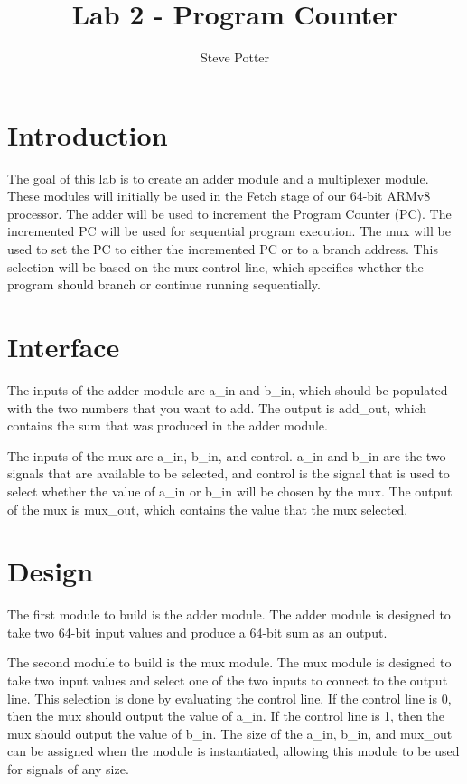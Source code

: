 \documentclass{article}
\author{Steve Potter}
\title{Lab 2 - Program Counter}
\begin{document}
\maketitle

\section{Introduction}
The goal of this lab is to create an adder module and a multiplexer module.  These modules will initially be used in the Fetch stage of our 64-bit ARMv8 processor.  The adder will be used to increment the Program Counter (PC).  The incremented PC will be used for sequential program execution.  The mux will be used to set the PC to either the incremented PC or to a branch address.  This selection will be based on the mux control line, which specifies whether the program should branch or continue running sequentially.

\section{Interface}
The inputs of the adder module are a\_in and b\_in, which should be populated with the two numbers that you want to add.  The output is add\_out, which contains the sum that was produced in the adder module.

The inputs of the mux are a\_in, b\_in, and control.  a\_in and b\_in are the two signals that are available to be selected, and control is the signal that is used to select whether the value of a\_in or b\_in will be chosen by the mux.  The output of the mux is mux\_out, which contains the value that the mux selected.

\section{Design}
The first module to build is the adder module.  The adder module is designed to take two 64-bit input values and produce a 64-bit sum as an output.

The second module to build is the mux module.  The mux module is designed to take two input values and select one of the two inputs to connect to the output line.  This selection is done by evaluating the control line.  If the control line is 0, then the mux should output the value of a\_in.  If the control line is 1, then the mux should output the value of b\_in.  The size of the a\_in, b\_in, and mux\_out can be assigned when the module is instantiated, allowing this module to be used for signals of any size.
\end{document}
